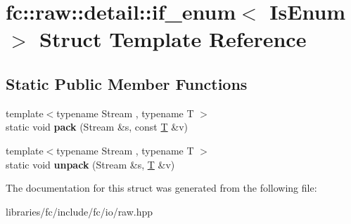 \hypertarget{structfc_1_1raw_1_1detail_1_1if__enum}{}\section{fc\+:\+:raw\+:\+:detail\+:\+:if\+\_\+enum$<$ Is\+Enum $>$ Struct Template Reference}
\label{structfc_1_1raw_1_1detail_1_1if__enum}
\subsection*{Static Public Member Functions}
\begin{DoxyCompactItemize}
\item 
\mbox{\label{structfc_1_1raw_1_1detail_1_1if__enum_a66ddfd833d54ac5b33ab56e0d8e50fa1}} 
{\footnotesize template$<$typename Stream , typename T $>$ }\\static void {\bfseries pack} (Stream \&s, const \mbox{\hyperlink{struct_t}{T}} \&v)
\item 
\mbox{\label{structfc_1_1raw_1_1detail_1_1if__enum_a6e98ac62c42ddf8bc0928fedd2557e6c}} 
{\footnotesize template$<$typename Stream , typename T $>$ }\\static void {\bfseries unpack} (Stream \&s, \mbox{\hyperlink{struct_t}{T}} \&v)
\end{DoxyCompactItemize}


The documentation for this struct was generated from the following file\+:\begin{DoxyCompactItemize}
\item 
libraries/fc/include/fc/io/raw.\+hpp\end{DoxyCompactItemize}
